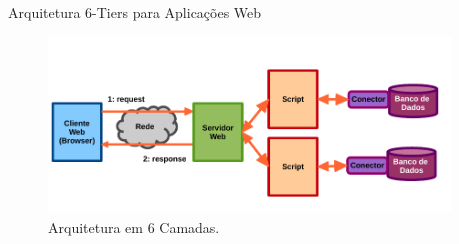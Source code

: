 \begin{frame}{Arquitetura 6-Tiers para Aplicações Web }
  \begin{figure}[h!]
    \centering
    \includegraphics[width=0.95\textwidth]{imagens/cliente-servidor-2.png}
    \caption{Arquitetura em 6 Camadas.}
  \end{figure}
  
\end{frame}
